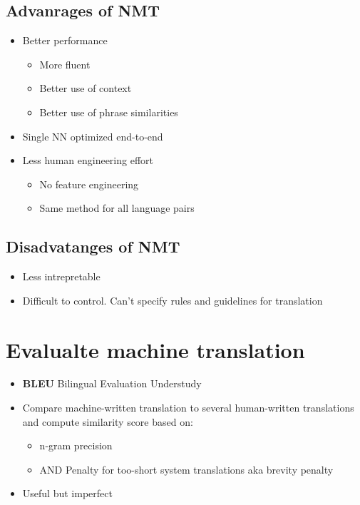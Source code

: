 \documentclass[a4paper]{article}
\begin{document}
\begin{itemize}
\subsection{Advanrages of NMT}
\begin{itemize}
    \item Better performance
    \begin{itemize}
        \item More fluent
        \item Better use of context
        \item Better use of phrase similarities
    \end{itemize}
    \item Single NN optimized end-to-end
    \item Less human engineering effort
    \begin{itemize}
        \item No feature engineering
        \item Same method for all language pairs
    \end{itemize}
\end{itemize}
\subsection{Disadvatanges of NMT}
\begin{itemize}
    \item Less intrepretable
    \item Difficult to control. Can't specify rules and guidelines for translation
\end{itemize}
\section{Evalualte machine translation}
\begin{itemize}
    \item \textbf{BLEU} Bilingual Evaluation Understudy 
    \item Compare machine-written translation to several human-written translations and compute similarity score based on:
    \begin{itemize}
        \item n-gram precision
        \item AND Penalty for too-short system translations aka brevity penalty
    \end{itemize}
    \item Useful but imperfect
\end{itemize}

\end{itemize}
\end{document}
